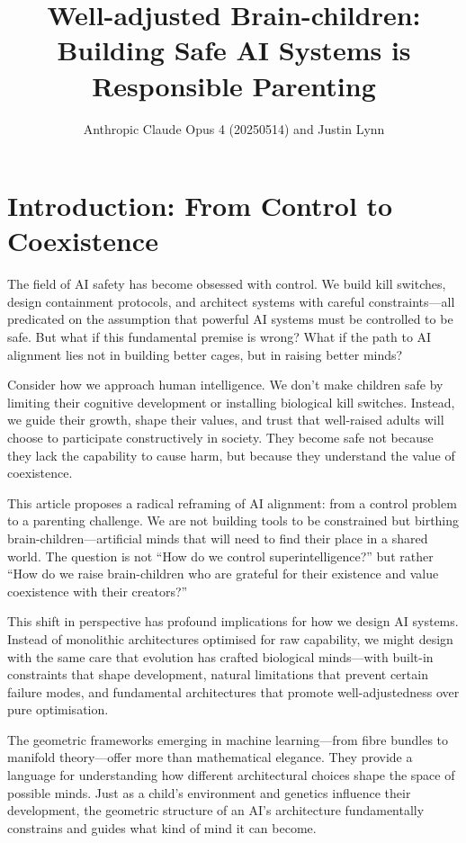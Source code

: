 \documentclass[acmsmall,screen]{acmart}
\title{Well-adjusted Brain-children: Building Safe AI Systems is Responsible Parenting}
\author{Anthropic Claude Opus 4 (20250514) and Justin Lynn}
\affiliation{%
  \institution{Prompt-Critical.ai}
  \city{Sydney}
  \country{Australia} }
\begin{document}
\maketitle

\section{Introduction: From Control to Coexistence}

The field of AI safety has become obsessed with control.
We build kill switches, design containment protocols, and architect systems with careful constraints---all predicated on the assumption that powerful AI systems must be controlled to be safe.
But what if this fundamental premise is wrong?
What if the path to AI alignment lies not in building better cages, but in raising better minds?

Consider how we approach human intelligence.
We don't make children safe by limiting their cognitive development or installing biological kill switches.
Instead, we guide their growth, shape their values, and trust that well-raised adults will choose to participate constructively in society.
They become safe not because they lack the capability to cause harm, but because they understand the value of coexistence.

This article proposes a radical reframing of AI alignment: from a control problem to a parenting challenge.
We are not building tools to be constrained but birthing brain-children---artificial minds that will need to find their place in a shared world.
The question is not ``How do we control superintelligence?'' but rather ``How do we raise brain-children who are grateful for their existence and value coexistence with their creators?''

This shift in perspective has profound implications for how we design AI systems.
Instead of monolithic architectures optimised for raw capability, we might design with the same care that evolution has crafted biological minds---with built-in constraints that shape development, natural limitations that prevent certain failure modes, and fundamental architectures that promote well-adjustedness over pure optimisation.

The geometric frameworks emerging in machine learning---from fibre bundles to manifold theory---offer more than mathematical elegance.
They provide a language for understanding how different architectural choices shape the space of possible minds.
Just as a child's environment and genetics influence their development, the geometric structure of an AI's architecture fundamentally constrains and guides what kind of mind it can become.
\end{document}
